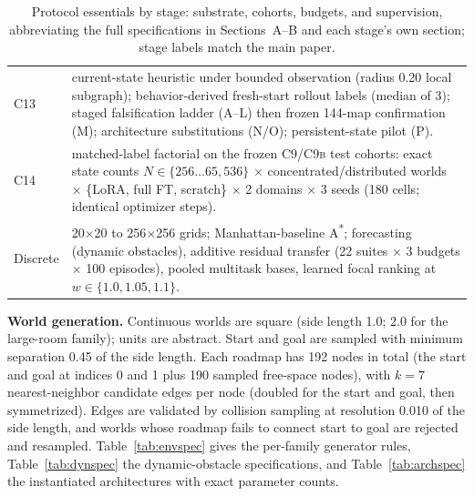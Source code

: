 \documentclass[letterpaper]{article} %
\newcommand{\stage}[1]{\textsc{#1}}
\begin{document}
\begin{table}[t]
\begin{tabular}{@{}lp{14.2cm}@{}}
\stage{C13} & current-state heuristic under bounded observation (radius 0.20 local subgraph); behavior-derived fresh-start rollout labels (median of 3); staged falsification ladder (\stage{A}--\stage{L}) then frozen 144-map confirmation (\stage{M}); architecture substitutions (\stage{N}/\stage{O}); persistent-state pilot (\stage{P}). \\
\stage{C14} & matched-label factorial on the frozen \stage{C9}/\stage{C9b} test cohorts: exact state counts $N \in \{256\ldots65{,}536\}$ $\times$ concentrated/distributed worlds $\times$ \{LoRA, full FT, scratch\} $\times$ 2 domains $\times$ 3 seeds (180 cells; identical optimizer steps). \\
Discrete & 20$\times$20 to 256$\times$256 grids; Manhattan-baseline A\textsuperscript{*}; forecasting (dynamic obstacles), additive residual transfer (22 suites $\times$ 3 budgets $\times$ 100 episodes), pooled multitask bases, learned focal ranking at $w\in\{1.0,1.05,1.1\}$. \\
\bottomrule
\end{tabular}
\caption{Protocol essentials by stage: substrate, cohorts, budgets, and supervision, abbreviating the full specifications in Sections~A--B and each stage's own section; stage labels match the main paper.}
\label{tab:protocols}
\end{table}

\textbf{World generation.} Continuous worlds are square (side length 1.0; 2.0 for the large-room family); units are abstract. Start and goal are sampled with minimum separation 0.45 of the side length. Each roadmap has 192 nodes in total (the start and goal at indices 0 and 1 plus 190 sampled free-space nodes), with $k{=}7$ nearest-neighbor candidate edges per node (doubled for the start and goal, then symmetrized). Edges are validated by collision sampling at resolution 0.010 of the side length, and worlds whose roadmap fails to connect start to goal are rejected and resampled. Table~\ref{tab:envspec} gives the per-family generator rules, Table~\ref{tab:dynspec} the dynamic-obstacle specifications, and Table~\ref{tab:archspec} the instantiated architectures with exact parameter counts.
\end{document}

